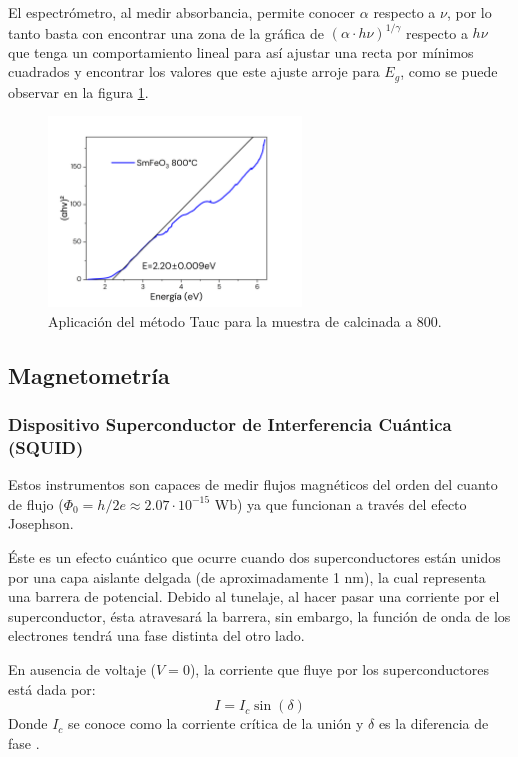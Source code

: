 \documentclass[../main.tex]{subfiles}
\begin{document}
El espectrómetro, al medir absorbancia, permite conocer $\alpha$ respecto a $\nu$, por lo tanto basta con encontrar una zona de la gráfica de $(\alpha\cdot h\nu)^{1/\gamma}$ respecto a $h\nu$ que tenga un comportamiento lineal para así ajustar una recta por mínimos cuadrados y encontrar los valores que este ajuste arroje para $E_g$, como se puede observar en la figura \ref{fig:ejemplotauc}.
\begin{figure}[H]
    \centering
    \includegraphics[width=0.6\textwidth]{fig/ejemplotauc.png}
    \caption{Aplicación del método Tauc para la muestra de \sama{} calcinada a 800\gradoC.}
    \label{fig:ejemplotauc}
\end{figure}
\subsection{Magnetometría}

\subsubsection{Dispositivo Superconductor de Interferencia Cuántica (SQUID)}
Estos instrumentos son capaces de medir flujos magnéticos del orden del cuanto de flujo ($\Phi_0=h/2e\approx2.07\cdot10^{-15}$ Wb) ya que funcionan a través del efecto Josephson.

Éste es un efecto cuántico que ocurre cuando dos superconductores están unidos por una capa aislante delgada (de aproximadamente 1 nm), la cual representa una barrera de potencial. Debido al tunelaje, al hacer pasar una corriente por el superconductor, ésta atravesará la barrera, sin embargo, la función de onda de los electrones tendrá una fase distinta del otro lado.

En ausencia de voltaje ($V=0$), la corriente que fluye por los superconductores está dada por:
\begin{equation}
    I=I_c\sin(\delta)
    \label{eq:corrientecritica}
\end{equation}
Donde $I_c$ se conoce como la corriente crítica de la unión y $\delta$ es la diferencia de fase \cite{Kirtley1999}.
\end{document}
